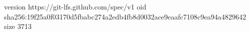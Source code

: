 version https://git-lfs.github.com/spec/v1
oid sha256:19f25a0f03170d5fbabc274a2edb4fb8d0032ace9eaafc7108c9ea94a4829642
size 3713
